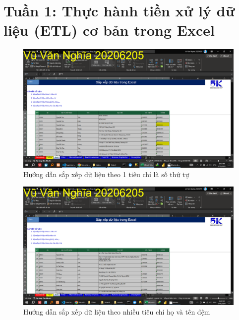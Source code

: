 \documentclass{article}
\begin{document}
\listoffigures
\newpage
\section{Tuần 1: Thực hành tiền xử lý dữ liệu (ETL) cơ bản trong Excel}
\begin{figure}[h]
\centering
\includegraphics[scale = 0.15]{Video1/HuongDan/1.png}
\caption{Hướng dẫn sắp xếp dữ liệu theo 1 tiêu chí là số thứ tự}
\end{figure}
\begin{figure}[h]
\centering
\includegraphics[scale = 0.15]{Video1/HuongDan/2.png}
\caption{Hướng dẫn sắp xếp dữ liệu theo nhiều tiêu chí họ và tên đệm}
\end{figure}
\end{document}
